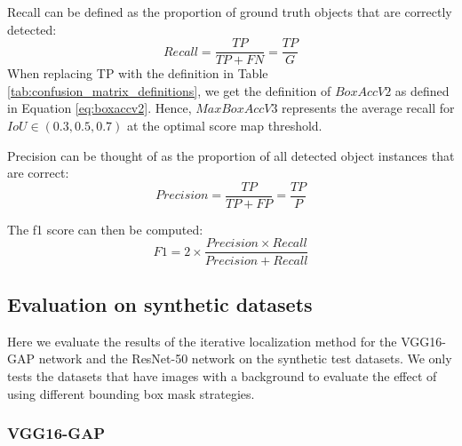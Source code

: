 Recall can be defined as the proportion of ground truth objects that are correctly detected:
\begin{equation}
Recall = \frac{TP}{TP + FN} = \frac{TP}{G}
\end{equation}
When replacing TP with the definition in Table \ref{tab:confusion_matrix_definitions}, we get the definition of $BoxAccV2$ as defined in Equation \ref{eq:boxaccv2}. Hence, 
$MaxBoxAccV3$ represents the average recall for $IoU \in (0.3, 0.5, 0.7)$ at the optimal score map threshold.

Precision can be thought of as the proportion of all detected object instances that are correct:
\begin{equation}
Precision = \frac{TP}{TP + FP} = \frac{TP}{P}
\end{equation}

The f1 score can then be computed:
\begin{equation}
F1 = 2 \times \frac{Precision \times Recall}{Precision + Recall}
\end{equation}

\subsection{Evaluation on synthetic datasets}
Here we evaluate the results of the iterative localization method for the VGG16-GAP network and the ResNet-50 network on the synthetic test datasets. We only tests the datasets that have images with a background to evaluate the effect of using different bounding box mask strategies.

\subsubsection{VGG16-GAP}

